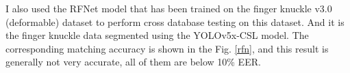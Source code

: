 I also used the RFNet model that has been trained on the finger knuckle v3.0 (deformable) dataset to perform cross database testing on this dataset. And it is the finger knuckle data segmented using the YOLOv5x-CSL model. The corresponding matching accuracy is shown in the Fig. \ref{rfn}, and this result is generally not very accurate, all of them are below 10\% EER.


